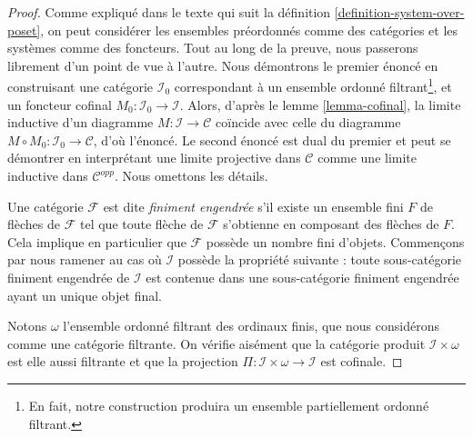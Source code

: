 \begin{proof}
Comme expliqué dans le texte qui suit la
définition \ref{definition-system-over-poset}, on peut considérer les
ensembles préordonnés comme des catégories et les systèmes comme des
foncteurs. Tout au long de la preuve, nous passerons librement d'un point de
vue à l'autre. Nous démontrons le premier énoncé en construisant une catégorie
$\mathcal{I}_0$ correspondant à un ensemble ordonné
filtrant\footnote{En fait, notre construction produira un ensemble
partiellement ordonné filtrant.}, et un foncteur cofinal
$M_0 : \mathcal{I}_0 \to \mathcal{I}$. Alors, d'après le
lemme \ref{lemma-cofinal}, la limite inductive d'un diagramme
$M : \mathcal{I} \to \mathcal{C}$ coïncide avec celle du diagramme
$M \circ M_0 : \mathcal{I}_0 \to \mathcal{C}$, d'où l'énoncé. Le second
énoncé est dual du premier et peut se démontrer en interprétant une limite
projective dans $\mathcal{C}$ comme une limite inductive dans
$\mathcal{C}^{opp}$. Nous omettons les détails.

\medskip\noindent
Une catégorie $\mathcal{F}$ est dite {\em finiment engendrée} s'il existe un
ensemble fini $F$ de flèches de $\mathcal{F}$ tel que toute flèche de
$\mathcal{F}$ s'obtienne en composant des flèches de $F$. Cela implique en
particulier que $\mathcal{F}$ possède un nombre fini d'objets. Commençons par
nous ramener au cas où $\mathcal{I}$ possède la propriété suivante : toute
sous-catégorie finiment engendrée de $\mathcal{I}$ est contenue dans une
sous-catégorie finiment engendrée ayant un unique objet final.

\medskip\noindent
Notons $\omega$ l'ensemble ordonné filtrant des ordinaux finis, que nous
considérons comme une catégorie filtrante. On vérifie aisément que la
catégorie produit $\mathcal{I}\times \omega$ est elle aussi filtrante et que
la projection
$\Pi : \mathcal{I} \times \omega \to \mathcal{I}$
est cofinale.


\end{proof}
